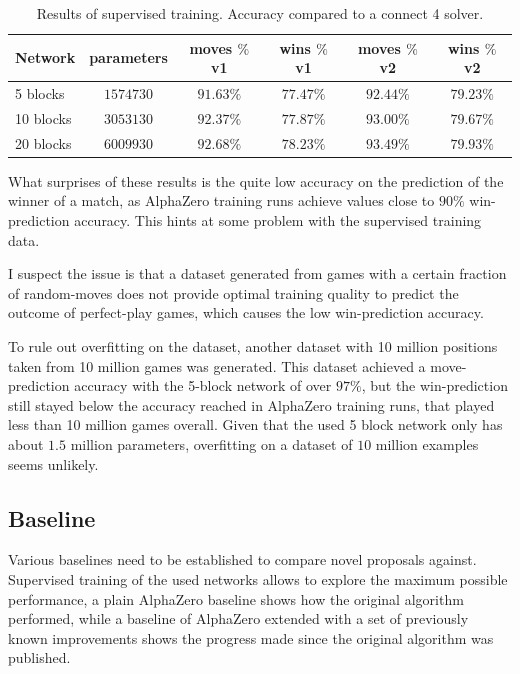 \documentclass[12pt,onecolumn,oneside,titlepage]{article}
\begin{document}
\begin{table} [H]
 \centering
  \begin{tabular}{ l | c c c c c }
  Network & parameters & moves $\%$ v1 & wins $\%$ v1 & moves $\%$ v2 & wins $\%$ v2 \\
  \hline
  5 blocks & $1574730$ & $91.63\%$ & $77.47\%$ & $92.44\%$ & $79.23\%$ \\
  10 blocks & $3053130$ & $92.37\%$ & $77.87\%$ & $93.00\%$ & $79.67\%$ \\
  20 blocks & $6009930$ & $92.68\%$ & $78.23\%$ & $93.49\%$ & $79.93\%$ \\
  \end{tabular}
  \caption{Results of supervised training. Accuracy compared to a connect 4 solver.}
  \label{t:supervised_results}
\end{table}


What surprises of these results is the quite low accuracy on the prediction of the winner of a match, as AlphaZero training runs achieve values close to $90\%$ win-prediction accuracy.
This hints at some problem with the supervised training data.

I suspect the issue is that a dataset generated from games with a certain fraction of random-moves does not provide optimal training quality to predict the outcome of perfect-play games, which causes the low win-prediction accuracy.

To rule out overfitting on the dataset, another dataset with 10 million positions taken from 10 million games was generated. This dataset achieved a move-prediction accuracy with the 5-block network 
of over $97\%$, but the win-prediction still stayed below the accuracy reached in AlphaZero training runs, that played less than 10 million games overall.
Given that the used 5 block network only has about $1.5$ million parameters, overfitting on a dataset of $10$ million examples seems unlikely.

\subsection{Baseline}

Various baselines need to be established to compare novel proposals against. Supervised training of the used networks allows to explore the maximum possible performance, a plain AlphaZero baseline shows how the original algorithm performed, while a baseline
of AlphaZero extended with a set of previously known improvements shows the progress made since the original algorithm was published.
\end{document}
